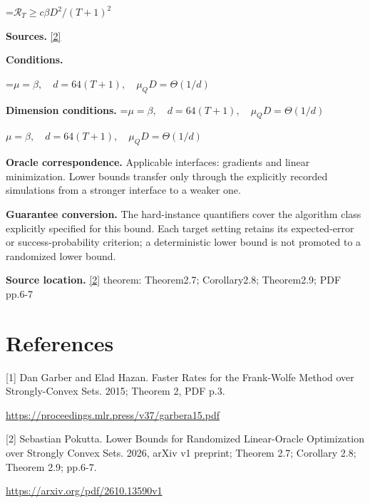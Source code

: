 \documentclass[10pt,a4paper]{article}
\newcommand{\AtlasMath}[1]{\par\begingroup\centering\setbox0=\hbox{$\displaystyle #1$}\ifdim\wd0>1.4\linewidth\typeout{ATLAS WIDE FORMULA: \the\wd0}\fi\ifdim\wd0>\linewidth\resizebox{\linewidth}{!}{\box0}\else\box0\fi\par\endgroup}
\newcommand{\AtlasInlineMath}[1]{\begingroup\setbox0=\hbox{$#1$}\ifdim\wd0>.4\linewidth\endgroup\AtlasMath{#1}\else\endgroup$#1$\fi}
\begin{document}
\AtlasMath{\mathcal{R}_T\ge c\beta D^2/(T+1)^2}
\textbf{Sources.} \href{https://arxiv.org/pdf/2610.13590v1}{[2]}

\textbf{Conditions.} 
\AtlasMath{\mu=\beta,\quad d=64(T+1),\quad\mu_QD=\Theta(1/d)}


\textbf{Dimension conditions.} \AtlasInlineMath{\mu=\beta,\quad d=64(T+1),\quad\mu_QD=\Theta(1/d)}

\textbf{Oracle correspondence.} Applicable interfaces: gradients and linear minimization. Lower bounds transfer only through the explicitly recorded simulations from a stronger interface to a weaker one.

\textbf{Guarantee conversion.} The hard-instance quantifiers cover the algorithm class explicitly specified for this bound. Each target setting retains its expected-error or success-probability criterion; a deterministic lower bound is not promoted to a randomized lower bound.

\textbf{Source location.} \href{https://arxiv.org/pdf/2610.13590v1}{[2]} theorem: Theorem2.7; Corollary2.8; Theorem2.9; PDF pp.6-7

\section{References}
[1] Dan Garber and Elad Hazan. Faster Rates for the Frank-Wolfe Method over Strongly-Convex Sets. 2015; Theorem 2, PDF p.3.

\url{https://proceedings.mlr.press/v37/garbera15.pdf}

[2] Sebastian Pokutta. Lower Bounds for Randomized Linear-Oracle Optimization over Strongly Convex Sets. 2026, arXiv v1 preprint; Theorem 2.7; Corollary 2.8; Theorem 2.9; pp.6-7.

\url{https://arxiv.org/pdf/2610.13590v1}
\end{document}
